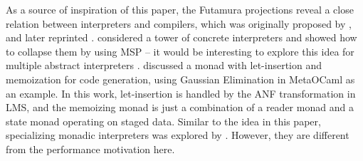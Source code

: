 As a source of inspiration of this paper, the Futamura projections reveal a
close relation between interpreters and compilers, which was
originally proposed by \citet{futamura1971partial}, and later reprinted \cite{Futamura1999}.
\citeauthor{Amin:2017:CTI:3177123.3158140} considered a tower of concrete
interpreters and showed how to collapse them by using MSP -- it would be interesting
to explore this idea for multiple abstract interpreters
\cite{Cousot:2019:AAI:3302515.3290355, Giacobazzi:2015:APA:2676726.2676987}.
\citet{10.1007/11561347_18} discussed a monad with let-insertion and
memoization for code generation, using Gaussian Elimination in MetaOCaml as an
example. In this work, let-insertion is handled by the ANF transformation in
LMS, and the memoizing monad is just a combination of a reader monad and a state monad
operating on staged data.  Similar to the idea in this paper, specializing
monadic interpreters was explored by \citet{danvy1991compiling,
DBLP:conf/dsl/SheardBP99}. However, they are different from the performance
motivation here. 
